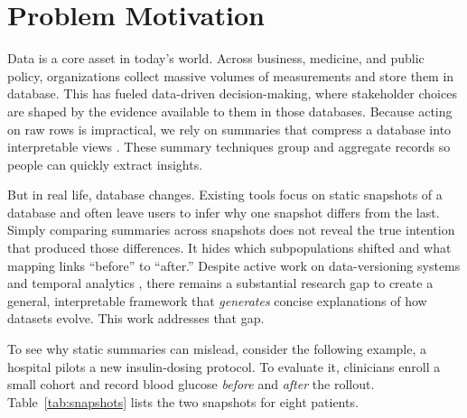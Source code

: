 \documentclass[9pt, twoside, twocolumn]{extarticle}
\begin{document}
\titleblock

\section{Problem Motivation}

Data is a core asset in today's world. Across business, medicine, and public policy, organizations collect massive volumes of measurements and store them in database. This has fueled data-driven decision-making, where stakeholder choices are shaped by the evidence available to them in those databases. Because acting on raw rows is impractical, we rely on summaries that compress a database into interpretable views \cite{Chandola_Kumar_2006, Joglekar_Garcia-Molina_Parameswaran_2019,joglekar2017interactive, Sarawagi_2001}. These summary techniques group and aggregate records so people can quickly extract insights. 

But in real life, database changes. Existing tools focus on static snapshots of a database and often leave users to infer why one snapshot differs from the last. Simply comparing summaries across snapshots does not reveal the true intention that produced those differences. It hides which subpopulations shifted and what mapping links ``before'' to ``after.'' Despite active work on data-versioning systems \cite{huang2017orpheusdb} and temporal analytics \cite{Bleifuß_Bornemann_Johnson_Kalashnikov_Naumann_Srivastava_2018, Bornemann_Bleifuß_Kalashnikov_Naumann_Srivastava_2018}, there remains a substantial research gap to create a general, interpretable framework that \emph{generates} concise explanations of how datasets evolve. This work addresses that gap.

To see why static summaries can mislead, consider the following example, a hospital pilots a new insulin-dosing protocol. To evaluate it, clinicians enroll a small cohort and record blood glucose \emph{before} and \emph{after} the rollout. Table~\ref{tab:snapshots} lists the two snapshots for eight patients.
\end{document}
